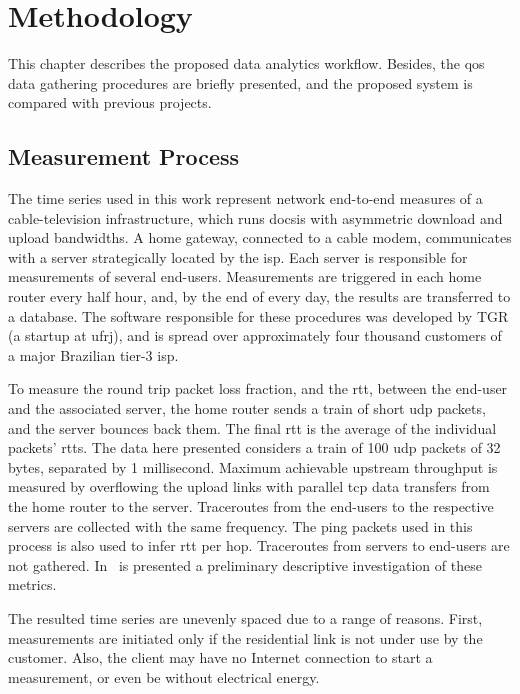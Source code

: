\chapter{Methodology}
\label{chap:methodology}

This chapter describes the proposed data analytics workflow.
Besides, the \gls*{qos} data gathering procedures are briefly presented,
and the proposed system is compared with previous projects.

\section{Measurement Process}

The time series used in this work represent network end-to-end measures of a
cable-television infrastructure, which runs \gls*{docsis} with asymmetric download and
upload bandwidths. A home gateway, connected to a cable modem, communicates
with a server strategically located by the \gls*{isp}.
Each server is responsible for measurements of several end-users.
Measurements are triggered in
each home router every half hour, and, by the end of every day,
the results are transferred to a database.
The software responsible for these procedures was
developed by TGR (a startup at \gls*{ufrj}),
and is spread over approximately four thousand customers of a major Brazilian
tier-3 \gls*{isp}.

To measure the round
trip packet loss fraction, and the \gls*{rtt}, between the end-user and the associated
server, the home router sends a train of short \gls*{udp} packets, and the server
bounces back them.
The final \gls*{rtt} is the average of the individual packets' \gls*{rtt}s.
The data here presented considers a train of 100 \gls*{udp} packets of 32 bytes,
separated by 1 millisecond.
Maximum achievable upstream throughput is measured by overflowing the upload
links with parallel \gls*{tcp} data transfers from the home router to the server.
Traceroutes from the end-users to the respective servers are collected with
the same frequency.
The ping packets used in this process is also used to infer \gls*{rtt} per hop.
Traceroutes from servers to end-users are not gathered.
In~\cite{a_preliminary_performance_measurement_study_of_residential_broadband_services_in_brazil}
is presented a preliminary descriptive investigation of these metrics.

The resulted time series are unevenly spaced due to a range of reasons. First,
measurements are initiated only if the residential link is not under use by the
customer. Also, the client may have no Internet connection to start a
measurement, or even be without electrical energy.

